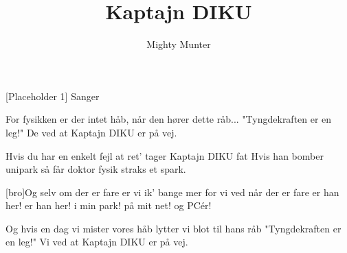 \documentclass[a4paper,11pt]{article}
\title{Kaptajn DIKU}
\author{Mighty Munter}
\begin{document}
\maketitle

\begin{roles}
[Placeholder 1] Sanger
\end{roles}

\begin{props}
\prop{}
\end{props}

  
\begin{song}For fysikken er der intet håb,
når den hører dette råb...
"Tyngdekraften er en leg!"
De ved at Kaptajn DIKU er på vej.

Hvis du har en enkelt fejl at ret'
tager Kaptajn DIKU fat
Hvis han bomber unipark
så får doktor fysik straks et spark.

[bro]Og selv om der er fare
er vi ik' bange mer
for vi ved når der er fare
er han her!
er han her!
i min park!
på mit net!
og PCér!

Og hvis en dag vi mister vores håb
lytter vi blot til hans råb
"Tyngdekraften er en leg!"
Vi ved at Kaptajn DIKU er på vej.


\end{song}
\end{document}
